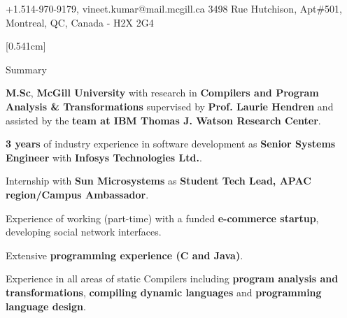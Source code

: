 \documentclass{resume} %
\begin{document}
\begin{hSubsection}{+1.514-970-9179, vineet.kumar@mail.mcgill.ca}
{%
}{3498 Rue Hutchison, Apt\#501, Montreal, QC, Canada - H2X 2G4}
\end{hSubsection}



[0.541cm]
\begin{rSection}{Summary}
\smallskip
\begin{lSubsection}
 \item \textbf{M.Sc}, \textbf{McGill University} with research in \textbf{Compilers and Program Analysis \& Transformations} supervised by \textbf{Prof. Laurie Hendren} and assisted by the \textbf{\xten team at IBM Thomas J. Watson Research Center}.
 \item \textbf{3 years} of industry experience in software development as \textbf{Senior Systems Engineer} with \textbf{Infosys Technologies Ltd.}.
 \item Internship with \textbf{Sun Microsystems} as \textbf{Student Tech Lead, APAC region/Campus Ambassador}.
 \item Experience of working (part-time) with a funded \textbf{e-commerce startup}, developing social network interfaces.
 \item Extensive \textbf{programming experience (C and Java)}.
 \item Experience in all areas of static Compilers including \textbf{program analysis and transformations}, \textbf{compiling dynamic languages} and \textbf{programming language design}.
 
\end{lSubsection}
\end{rSection}
\end{document}
